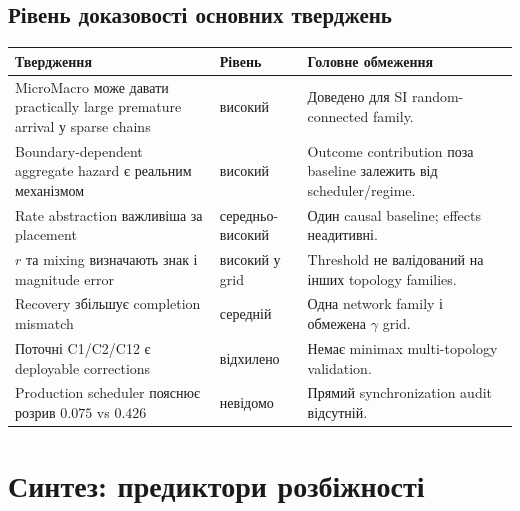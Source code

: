 \documentclass[11pt,a4paper]{article}
\begin{document}
\subsection{Рівень доказовості основних тверджень}

\small
\setlength{\tabcolsep}{4pt}
\begin{longtable}{p{5.5cm}p{2.0cm}p{5.5cm}}
\toprule
Твердження & Рівень & Головне обмеження\\
\midrule
MicroMacro може давати practically large premature arrival у sparse chains & високий & Доведено для SI random-connected family.\\
Boundary-dependent aggregate hazard є реальним механізмом & високий & Outcome contribution поза baseline залежить від scheduler/regime.\\
Rate abstraction важливіша за placement & середньо-високий & Один causal baseline; effects неадитивні.\\
$r$ та mixing визначають знак і magnitude error & високий у grid & Threshold не валідований на інших topology families.\\
Recovery збільшує completion mismatch & середній & Одна network family і обмежена $\gamma$ grid.\\
Поточні C1/C2/C12 є deployable corrections & відхилено & Немає minimax multi-topology validation.\\
Production scheduler пояснює розрив $0.075$ vs $0.426$ & невідомо & Прямий synchronization audit відсутній.\\
\bottomrule
\end{longtable}
\normalsize

\section{Синтез: предиктори розбіжності}
\end{document}
